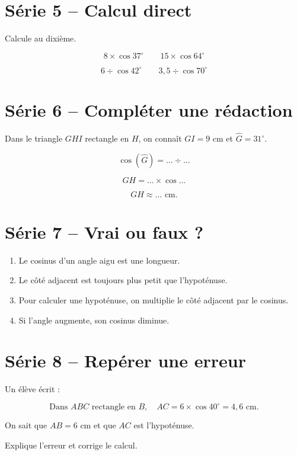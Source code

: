 \documentclass[12pt,a4paper]{article}
\begin{document}
\section*{Série 5 -- Calcul direct}

Calcule au dixième.

\[
8\times\cos 37^\circ
\qquad
15\times\cos 64^\circ
\]

\[
6\div\cos 42^\circ
\qquad
3{,}5\div\cos 70^\circ
\]

\section*{Série 6 -- Compléter une rédaction}

Dans le triangle \(GHI\) rectangle en \(H\), on connaît
\(GI=9\) cm et \(\widehat G=31^\circ\).

\[
\cos(\widehat G)=\ldots\div\ldots
\]

\[
GH=\ldots\times\cos\ldots
\]

\[
GH\approx\ldots\text{ cm}.
\]

\section*{Série 7 -- Vrai ou faux ?}

\begin{enumerate}
  \item Le cosinus d'un angle aigu est une longueur.
  \item Le côté adjacent est toujours plus petit que l'hypoténuse.
  \item Pour calculer une hypoténuse, on multiplie le côté adjacent par le cosinus.
  \item Si l'angle augmente, son cosinus diminue.
\end{enumerate}

\section*{Série 8 -- Repérer une erreur}

Un élève écrit :

\[
\text{Dans }ABC\text{ rectangle en }B,\quad
AC=6\times\cos 40^\circ=4{,}6\text{ cm}.
\]

On sait que \(AB=6\) cm et que \(AC\) est l'hypoténuse.

Explique l'erreur et corrige le calcul.
\end{document}
